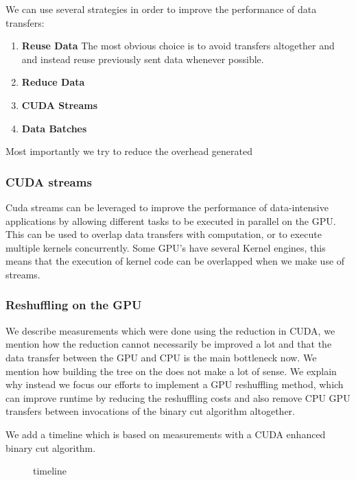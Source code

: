 \documentclass[]{article}
\begin{document}
We can use several strategies in order to improve the performance of data transfers: 

\begin{enumerate}
	\item \textbf{Reuse Data} The most obvious choice is to avoid transfers altogether and and instead reuse previously sent data whenever possible. 
	\item \textbf{Reduce Data} 
	\item \textbf{CUDA Streams} 
	\item \textbf{Data Batches}
	
\end{enumerate}

Most importantly we try to reduce the overhead generated 

\subsubsection{CUDA streams}

Cuda streams can be leveraged to improve the performance of data-intensive applications by allowing different tasks to be executed in parallel on the GPU. This can be used to overlap data transfers with computation, or to execute multiple kernels concurrently. Some GPU's have several Kernel engines, this means that the execution of kernel code can be overlapped when we make use of streams.

\subsubsection{Reshuffling on the GPU}

We describe measurements which were done using the reduction in CUDA, we mention how the reduction cannot necessarily be improved a lot and that the data transfer between the GPU and CPU is the main bottleneck now. We mention how building the tree on the does not make a lot of sense. We explain why instead we focus our efforts to implement a GPU reshuffling method, which can improve runtime by reducing the reshuffling costs and also remove CPU GPU transfers between invocations of the binary cut algorithm altogether. 

We add a timeline which is based on measurements with a CUDA enhanced binary cut algorithm. 
\begin{figure}[H]
	\begin{center}
	\end{center}
	\caption{timeline}
	\label{u}
\end{figure}
\end{document}
